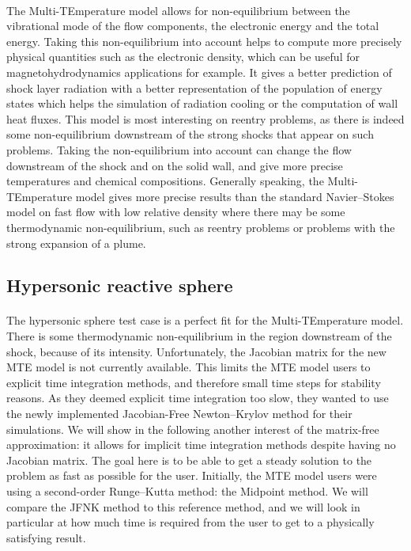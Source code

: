       \paragraph{}
      The Multi-TEmperature model allows for non-equilibrium between the vibrational mode of the flow components, the electronic energy and the total energy.
      Taking this non-equilibrium into account helps to compute more precisely physical quantities such as the electronic density, which can be useful for magnetohydrodynamics applications for example.
      It gives a better prediction of shock layer radiation with a better representation of the population of energy states which helps the simulation of radiation cooling or the computation of wall heat fluxes.
      This model is most interesting on reentry problems, as there is indeed some non-equilibrium downstream of the strong shocks that appear on such problems.
      Taking the non-equilibrium into account can change the flow downstream of the shock and on the solid wall, and give more precise temperatures and chemical compositions.
      Generally speaking, the Multi-TEmperature model gives more precise results than the standard Navier--Stokes model on fast flow with low relative density where there may be some thermodynamic non-equilibrium, such as reentry problems or problems with the strong expansion of a plume.


    \subsection{Hypersonic reactive sphere}

      \paragraph{}
      The hypersonic sphere test case is a perfect fit for the Multi-TEmperature model.
      There is some thermodynamic non-equilibrium in the region downstream of the shock, because of its intensity.
      Unfortunately, the Jacobian matrix for the new MTE model is not currently available.
      This limits the MTE model users to explicit time integration methods, and therefore small time steps for stability reasons.
      As they deemed explicit time integration too slow, they wanted to use the newly implemented Jacobian-Free Newton--Krylov method for their simulations.
      We will show in the following another interest of the matrix-free approximation: it allows for implicit time integration methods despite having no Jacobian matrix.
      The goal here is to be able to get a steady solution to the problem as fast as possible for the user.
      Initially, the MTE model users were using a second-order Runge--Kutta method: the Midpoint method.
      We will compare the JFNK method to this reference method, and we will look in particular at how much time is required from the user to get to a physically satisfying result.


